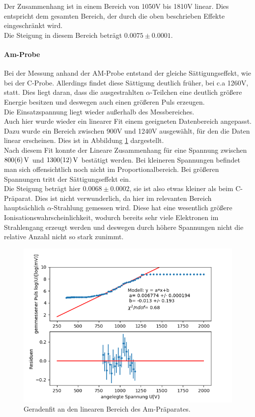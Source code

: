 \documentclass[12pt,a4paper]{article}
\begin{document}
Der Zusammenhang ist in einem Bereich von 1050V bis 1810V linear. Dies entspricht dem gesamten Bereich, der durch die oben beschrieben Effekte eingeschränkt wird.\\
Die Steigung in diesem Bereich beträgt $0.0075\pm 0.0001$.

\paragraph{Am-Probe}
Bei der Messung anhand der AM-Probe entstand der gleiche Sättigungseffekt, wie bei der C-Probe. Allerdings findet diese Sättigung deutlich früher, bei c.a 1260V, statt. Dies liegt daran, dass die ausgestrahlten $\alpha$-Teilchen eine deutlich größere Energie besitzen und deswegen auch einen größeren Puls erzeugen.\\
Die Einsatzspannung liegt wieder außerhalb des Messbereiches.\\
Auch hier wurde wieder ein linearer Fit einem geeigneten Datenbereich angepasst. Dazu wurde ein Bereich zwischen 900V und 1240V ausgewählt, für den die Daten linear erscheinen. Dies ist in Abbildung \ref{fig:AMPulsfit} dargestellt.\\
Nach diesem Fit konnte der Lineare Zusammenhang für eine Spannung zwischen $\SI{800\pm 6}{V}$ und $\SI{1300\pm 12}{V}$ bestätigt werden. Bei kleineren Spannungen befindet man sich offensichtlich noch nicht im Proportionalbereich. Bei größeren Spannungen tritt der Sättigungseffekt ein.\\
Die Steigung beträgt hier $0.0068\pm 0.0002$, sie ist also etwas kleiner als beim C-Präparat. Dies ist nicht verwunderlich, da hier im relevanten Bereich hauptsächlich $\alpha$-Strahlung gemessen wird. Diese hat eine wesentlich größere Ionisationswahrscheinlichkeit, wodurch bereits sehr viele Elektronen im Strahlengang erzeugt werden und deswegen durch höhere Spannungen nicht die relative Anzahl nicht so stark zunimmt.



\begin{figure}
\centering
\includegraphics[scale=0.8]{Bilder/Prop/AM_Pulsfit.PNG}
\caption{Geradenfit an den linearen Bereich des Am-Präparates.}
\label{fig:AMPulsfit}
\end{figure}
\end{document}
